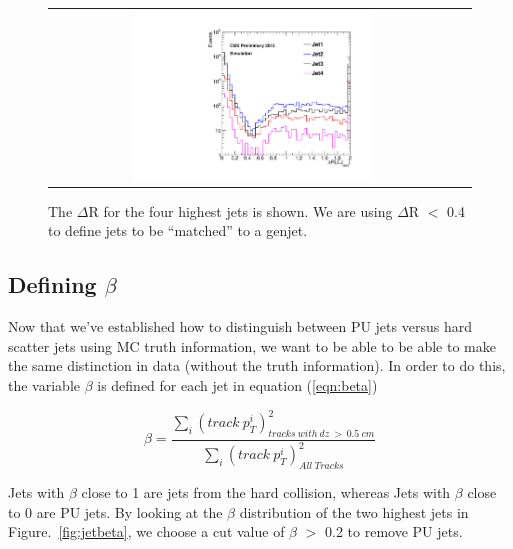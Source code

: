 \begin{figure}[!h]
\begin{center}
\begin{tabular}{cc}
\includegraphics[width=0.6\textwidth]{plots/dralljets.pdf}
\end{tabular}
\caption{The $\Delta$R for the four highest \pt jets is shown. We are using $\Delta$R $<$ 0.4 to define jets to be ``matched'' to a genjet.
\label{fig:dralljets}
}
\end{center}
\end{figure}

\subsection{Defining $\beta$}
Now that we've established how to distinguish between PU jets versus hard scatter jets using MC truth information, we want to be able to be able to make the same distinction in data (without the truth information). In order to do this, the variable $\beta$ is defined for each jet in equation (\ref{eqn:beta}) 

\begin{equation}
\beta = \frac{\sum_i({track~p_T^i})^2_{tracks~with~dz~>~0.5~cm}}{\sum_i ({track~p_T^i})^2_{All~Tracks}}
\label{eqn:beta}
\end{equation}

Jets with $\beta$ close to 1 are jets from the hard collision, whereas Jets with $\beta$ close to 0 are PU jets. By looking at the $\beta$ distribution of the two highest \pt jets in Figure.~\ref{fig:jetbeta}, we choose a cut value of $\beta$ $>$ 0.2 to remove PU jets. 



